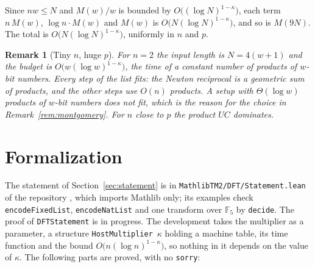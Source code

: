 \documentclass[11pt]{amsart}
\newtheorem{remark}[lemma]{Remark}
\newcommand{\F}{\mathbb{F}}
\begin{document}
Since $nw \le N$ and $M(w)/w$ is bounded by $O\bigl((\log N)^{1-\kappa}\bigr)$, each term
$n\, M(w)$, $\log n \cdot M(w)$ and $M(w)$ is $O\bigl(N (\log N)^{1-\kappa}\bigr)$, and so is
$M(9N)$. The total is $O\bigl(N (\log N)^{1-\kappa}\bigr)$, uniformly in $n$ and $p$.

\begin{remark}[Tiny $n$, huge $p$]
For $n = 2$ the input length is $N = 4(w+1)$ and the budget is $O\bigl(w (\log w)^{1-\kappa}\bigr)$,
the time of a constant number of products of $w$-bit numbers. Every step of the list fits: the
Newton reciprocal is a geometric sum of products, and the other steps use $O(n)$ products.
A setup with $\Theta(\log w)$ products of $w$-bit numbers does not fit, which is the reason for
the choice in Remark~\ref{rem:montgomery}. For $n$ close to $p$ the product $UC$ dominates.
\end{remark}

\section{Formalization}
\label{sec:formal}

The statement of Section~\ref{sec:statement} is in \texttt{MathlibTM2/DFT/Statement.lean} of the
repository \cite{IMB}, which imports Mathlib only; its examples check \texttt{encodeFixedList},
\texttt{encodeNatList} and one transform over $\F_5$ by \texttt{decide}. The proof of
\texttt{DFTStatement} is in progress. The development takes the multiplier as a parameter,
a structure \texttt{HostMultiplier}~$\kappa$ holding a machine table, its time function and the
bound $O\bigl(n(\log n)^{1-\kappa}\bigr)$, so nothing in it depends on the value of $\kappa$.
The following parts are proved, with no \texttt{sorry}:
\end{document}
